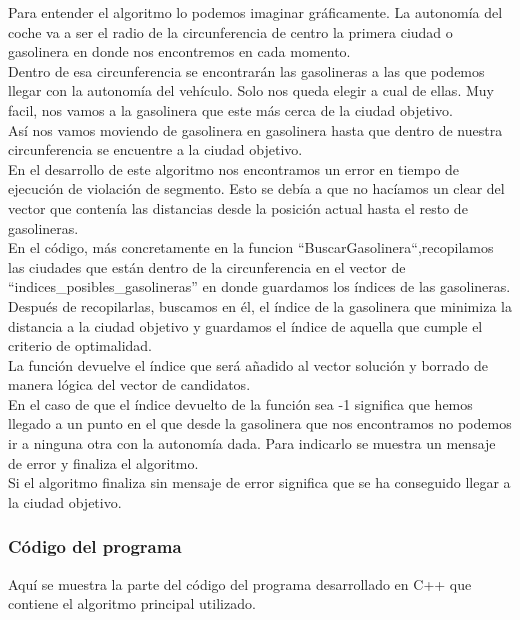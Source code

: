 \documentclass[11pt,a4paper]{article} %
\begin{document}
Para entender el algoritmo lo podemos imaginar gráficamente. La autonomía del coche va a ser el radio de la circunferencia de centro la primera ciudad o gasolinera en donde nos encontremos en cada momento.\\

Dentro de esa circunferencia se encontrarán las gasolineras a las que podemos llegar con la autonomía del vehículo. Solo nos queda elegir a cual de ellas. Muy facil, nos vamos a la gasolinera que este más cerca de la ciudad objetivo. \\

Así nos vamos moviendo de gasolinera en gasolinera hasta que dentro de nuestra circunferencia se encuentre a la ciudad objetivo.\\

En el desarrollo de este algoritmo nos encontramos un error en tiempo de ejecución de violación de segmento. Esto se debía a que no hacíamos un clear del vector que contenía las distancias desde la posición actual hasta el resto de gasolineras.\\

En el código, más concretamente en la funcion “BuscarGasolinera“,recopilamos las ciudades que están dentro de la circunferencia en el vector de “indices\_posibles\_gasolineras” en donde guardamos los índices de las gasolineras.\\

Después de recopilarlas, buscamos en él, el índice de la gasolinera que minimiza la distancia a la ciudad objetivo y guardamos el índice de aquella que cumple el criterio de optimalidad.\\

La función devuelve el índice que será añadido al vector solución y borrado de manera lógica del vector de candidatos.\\

En el caso de que el índice devuelto de la función sea -1 significa que hemos llegado a un punto en el que desde la gasolinera que nos encontramos no podemos ir a ninguna otra con la autonomía dada. Para indicarlo se muestra un mensaje de error y finaliza el algoritmo.\\

Si el algoritmo finaliza sin mensaje de error significa que se ha conseguido llegar a la ciudad objetivo.\\

\subsubsection{Código del programa}
Aquí se muestra la parte del código del programa desarrollado en C++ que contiene el algoritmo principal utilizado.
\end{document}
